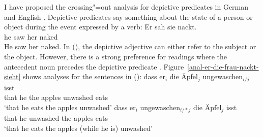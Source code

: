 I have proposed the crossing"=out analysis for depictive predicates in German and English 
\citep{Mueller2004c,Mueller2008a}. Depictive predicates say something about the state of a person or object during the event
expressed by a verb:
\eal
\ex 
\gll Er sah sie nackt.\footnotemark\\
	 he saw her naked\\
\ex He saw her naked.
\zl
In (), the depictive adjective can either refer to the subject or the object. However, there is a strong preference for readings where
the antecedent noun precedes the depictive predicate
\citep[]{Loetscher85}. Figure~\vref{anal-er-die-frau-nackt-sieht} shows analyses for the
sentences in ():
\eal
\ex 
\gll dass er$_i$ die Äpfel$_j$ ungewaschen$_{i/j}$ isst\\
	 that he the apples unwashed eats\\
\glt `that he eats the apples unwashed'
\ex 
\gll dass er$_i$ ungewaschen$_{i/*j}$ die Äpfel$_j$ isst\\
	 that he unwashed the apples eats\\
\glt `that he eats the apples (while he is) unwashed'
\zl
